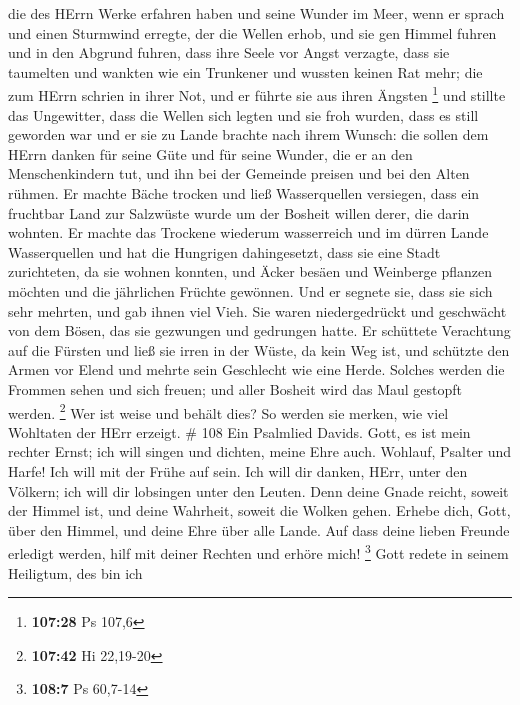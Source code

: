  die des HErrn Werke erfahren haben und seine Wunder im
Meer,  wenn er sprach und einen Sturmwind erregte, der die
Wellen erhob,  und sie gen Himmel fuhren und in den Abgrund
fuhren, dass ihre Seele vor Angst verzagte,  dass sie
taumelten und wankten wie ein Trunkener und wussten keinen Rat mehr;
 die zum HErrn schrien in ihrer Not, und er führte sie aus
ihren Ängsten \footnote{\textbf{107:28} Ps 107,6}  und
stillte das Ungewitter, dass die Wellen sich legten  und
sie froh wurden, dass es still geworden war und er sie zu Lande brachte
nach ihrem Wunsch:  die sollen dem HErrn danken für seine
Güte und für seine Wunder, die er an den Menschenkindern tut,
 und ihn bei der Gemeinde preisen und bei den Alten rühmen.
 Er machte Bäche trocken und ließ Wasserquellen versiegen,
 dass ein fruchtbar Land zur Salzwüste wurde um der Bosheit
willen derer, die darin wohnten.  Er machte das Trockene
wiederum wasserreich und im dürren Lande Wasserquellen  und
hat die Hungrigen dahingesetzt, dass sie eine Stadt zurichteten, da sie
wohnen konnten,  und Äcker besäen und Weinberge pflanzen
möchten und die jährlichen Früchte gewönnen.  Und er
segnete sie, dass sie sich sehr mehrten, und gab ihnen viel Vieh.
 Sie waren niedergedrückt und geschwächt von dem Bösen, das
sie gezwungen und gedrungen hatte.  Er schüttete Verachtung
auf die Fürsten und ließ sie irren in der Wüste, da kein Weg ist,
 und schützte den Armen vor Elend und mehrte sein
Geschlecht wie eine Herde.  Solches werden die Frommen
sehen und sich freuen; und aller Bosheit wird das Maul gestopft werden.
\footnote{\textbf{107:42} Hi 22,19-20}  Wer ist weise und
behält dies? So werden sie merken, wie viel Wohltaten der HErr erzeigt.
\# 108  Ein Psalmlied Davids.  Gott, es ist mein
rechter Ernst; ich will singen und dichten, meine Ehre auch.
 Wohlauf, Psalter und Harfe! Ich will mit der Frühe auf
sein.  Ich will dir danken, HErr, unter den Völkern; ich
will dir lobsingen unter den Leuten.  Denn deine Gnade
reicht, soweit der Himmel ist, und deine Wahrheit, soweit die Wolken
gehen.  Erhebe dich, Gott, über den Himmel, und deine Ehre
über alle Lande.  Auf dass deine lieben Freunde erledigt
werden, hilf mit deiner Rechten und erhöre mich! \footnote{\textbf{108:7}
  Ps 60,7-14}  Gott redete in seinem Heiligtum, des bin ich
